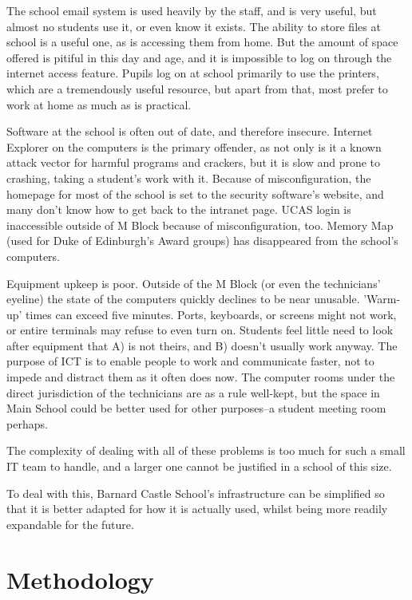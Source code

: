 \documentclass[a4paper,leqno,titlepage]{article}
\begin{document}
The school email system is used heavily by the staff, and is very useful, but
almost no students use it, or even know it exists.
The ability to store files at school is a useful one, as is accessing them from
home. But the amount of space offered is pitiful in this day and age, and it is
impossible to log on through the internet access feature.
Pupils log on at school primarily to use the printers, which are a tremendously
useful resource, but apart from that, most prefer to work at home as much as is
practical.


Software at the school is often out of date, and therefore insecure.
Internet Explorer on the computers is the primary offender, as not only is it
a known attack vector for harmful programs and crackers, but it is slow and
prone to crashing, taking a student's work with it. Because of misconfiguration,
the homepage for most of the school is set to the security software's website,
and many don't know how to get back to the intranet page. UCAS login is
inaccessible outside of M Block because of misconfiguration, too. Memory Map
(used for Duke of Edinburgh's Award groups) has disappeared from the school's
computers.


Equipment upkeep is poor. Outside of the M Block (or even the
technicians' eyeline) the state of the computers quickly declines to be near
unusable. 'Warm-up' times can exceed five minutes. Ports, keyboards, or screens
might not work, or entire terminals may refuse to even turn on.
Students feel little need to look after equipment that A) is not theirs,
and B) doesn't usually work anyway. The purpose of ICT is to enable
people to work and communicate faster, not to impede and distract them as it
often does now. The computer rooms under the direct jurisdiction of the
technicians are as a rule well-kept, but the space in Main School could be
better used for other purposes--a student meeting room perhaps.


The complexity of dealing with all of these problems is too much for such a
small IT team to handle, and a larger one cannot be justified in a school of
this size.


To deal with this, Barnard Castle School's infrastructure can be simplified
so that it is better adapted for how it is actually used, whilst being more
readily expandable for the future.



\break

\section{Methodology}
\end{document}
